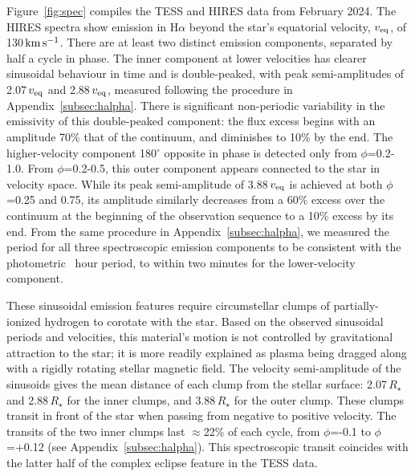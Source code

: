 \documentclass[11pt,twocolumn,tighten,linenumbers]{aastex7}
\newcommand{\kms}{\ensuremath{\rm km\,s^{-1}}}
\begin{document}
Figure~\ref{fig:spec} compiles the TESS and HIRES data from February
2024.  The HIRES spectra show emission in H$\alpha$ beyond the star's
equatorial velocity, $v_{\rm eq}$, of 130\,\kms.  There are at least
two distinct emission components, separated by half a cycle in phase.
The inner component at lower velocities has clearer sinusoidal
behaviour in time and is double-peaked, with peak semi-amplitudes of
2.07\,$v_{\rm eq}$ and 2.88\,$v_{\rm eq}$, measured following the
procedure in Appendix~\ref{subsec:halpha}.  There is significant
non-periodic variability in the emissivity of this double-peaked
component: the flux excess begins with an amplitude 70\% that of the
continuum, and diminishes to 10\% by the end.  The higher-velocity
component 180$^\circ$ opposite in phase is detected only from
$\phi$=0.2-1.0.  From $\phi$=0.2-0.5, this outer component appears
connected to the star in velocity space.  While its peak
semi-amplitude of 3.88\,$v_{\rm eq}$ is achieved at both $\phi$=0.25
and 0.75, its amplitude similarly decreases from a 60\% excess over
the continuum at the beginning of the observation sequence to a 10\%
excess by its end.  
From the same procedure in Appendix~\ref{subsec:halpha},
we measured
the period for all three spectroscopic
emission components to be consistent with the photometric \periodhr\ hour
period, to within two minutes for the lower-velocity component.  

These sinusoidal emission features require circumstellar clumps of
partially-ionized hydrogen to corotate with the star.  Based on the
observed sinusoidal periods and velocities, this material's motion is
not controlled by gravitational attraction to the star; it is more
readily explained as plasma being dragged along
with a rigidly rotating stellar magnetic field.  The velocity
semi-amplitude of the sinusoids gives the mean distance of each clump
from the stellar surface: 2.07\,$R_\star$ and 2.88\,$R_\star$ for the
inner clumps, and 3.88\,$R_\star$ for the outer clump.   These clumps
transit in front of the star when passing from negative to positive
velocity.  The transits of the two inner clumps last $\approx$22\% of
each cycle, from $\phi$=-0.1 to $\phi$=+0.12 (see
Appendix~\ref{subsec:halpha}).  This spectroscopic transit coincides with
the latter half of the complex eclipse feature in the TESS data.
\end{document}
